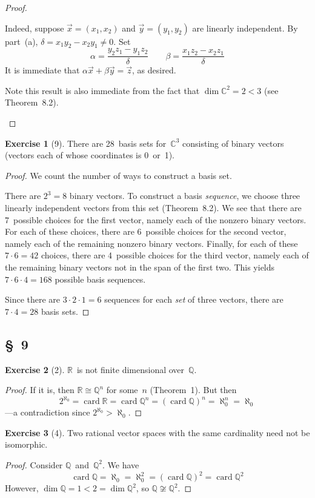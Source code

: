 \documentclass[letterpaper,12pt]{article}
\newcommand{\Q}{\mathbb{Q}}
\newcommand{\R}{\mathbb{R}}
\newcommand{\C}{\mathbb{C}}
\newcommand{\iso}{\cong}
\DeclareMathOperator{\card}{card}
\theoremstyle{definition}
\newtheorem*{exer}{Exercise}
\theoremstyle{remark}
\theoremstyle{direction}
\begin{document}
\begin{proof}
\begin{enumerate}
Indeed, suppose \(\vec{x}=(x_1,x_2)\) and \(\vec{y}=(y_1,y_2)\) are linearly independent. By part~(a), \(\delta=x_1y_2-x_2y_1\ne0\). Set
\[
\alpha=\frac{y_2z_1-y_1z_2}{\delta}
\qquad
\beta=\frac{x_1z_2-x_2z_1}{\delta}
\]
It is immediate that \(\alpha\vec{x}+\beta\vec{y}=\vec{z}\), as desired.

Note this result is also immediate from the fact that \(\dim\C^2=2<3\) (see Theorem~8.2).\qedhere
\end{enumerate}
\end{proof}

\begin{exer}[9]
There are 28~basis sets for~\(\C^3\) consisting of binary vectors (vectors each of whose coordinates is 0~or~1).
\end{exer}
\begin{proof}
We count the number of ways to construct a basis set.

There are \(2^3=8\) binary vectors. To construct a basis \emph{sequence}, we choose three linearly independent vectors from this set (Theorem~8.2). We see that there are 7~possible choices for the first vector, namely each of the nonzero binary vectors. For each of these choices, there are 6~possible choices for the second vector, namely each of the remaining nonzero binary vectors. Finally, for each of these \(7\cdot6=42\) choices, there are 4~possible choices for the third vector, namely each of the remaining binary vectors not in the span of the first two. This yields \(7\cdot6\cdot4=168\) possible basis sequences.

Since there are \(3\cdot2\cdot1=6\) sequences for each \emph{set} of three vectors, there are \(7\cdot4=28\) basis sets.
\end{proof}

\subsection*{\S~9}
\begin{exer}[2]
\(\R\)~is not finite dimensional over~\(\Q\).
\end{exer}
\begin{proof}
If it is, then \(\R\iso\Q^n\) for some~\(n\) (Theorem~1). But then
\[2^{\aleph_0}=\card\R=\card\Q^n=(\card\Q)^n=\aleph_0^n=\aleph_0\]
---a contradiction since \(2^{\aleph_0}>\aleph_0\).
\end{proof}

\begin{exer}[4]
Two rational vector spaces with the same cardinality need not be isomorphic.
\end{exer}
\begin{proof}
Consider \(\Q\)~and~\(\Q^2\). We have
\[\card{\Q}=\aleph_0=\aleph_0^2=(\card\Q)^2=\card\Q^2\]
However, \(\dim\Q=1<2=\dim\Q^2\), so \(\Q\not\iso\Q^2\).
\end{proof}
\end{document}
